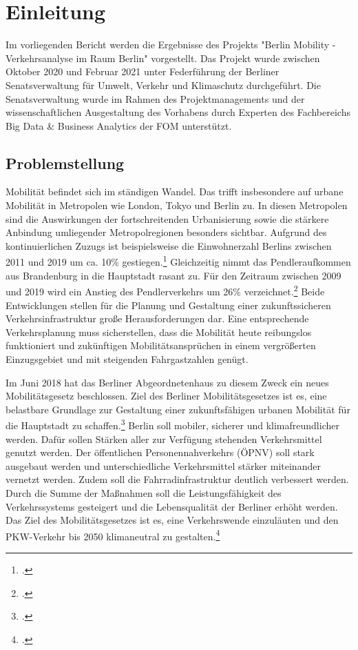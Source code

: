 \section{Einleitung}
Im vorliegenden Bericht werden die Ergebnisse des Projekts "Berlin Mobility - Verkehrsanalyse im Raum Berlin" vorgestellt. Das Projekt wurde zwischen Oktober 2020 und Februar 2021 unter Federführung der Berliner Senatsverwaltung für Umwelt, Verkehr und Klimaschutz durchgeführt. Die Senatsverwaltung wurde im Rahmen des Projektmanagements und der wissenschaftlichen Ausgestaltung des Vorhabens durch Experten des Fachbereichs Big Data \& Business Analytics der \ac{FOM} unterstützt.

\subsection{Problemstellung}\label{problems}
Mobilität befindet sich im ständigen Wandel. Das trifft insbesondere auf urbane Mobilität in Metropolen wie London, Tokyo und Berlin zu. In diesen Metropolen sind die Auswirkungen der fortschreitenden Urbanisierung sowie die stärkere Anbindung umliegender Metropolregionen besonders sichtbar. Aufgrund des kontinuierlichen Zuzugs ist beispielsweise die Einwohnerzahl Berlins zwischen 2011 und 2019 um ca. 10\% gestiegen.\footcite{Statista.2020} Gleichzeitig nimmt das Pendleraufkommen aus Brandenburg in die Hauptstadt rasant zu. Für den Zeitraum zwischen 2009 und 2019 wird ein Anstieg des Pendlerverkehrs um 26\% verzeichnet.\footcite{VBB-Pendlerblatt.2020} %
Beide Entwicklungen stellen für die Planung und Gestaltung einer zukunftssicheren Verkehrsinfrastruktur große Herausforderungen dar. Eine entsprechende Verkehrsplanung muss sicherstellen, dass die Mobilität heute reibungslos funktioniert und zukünftigen Mobilitätsansprüchen in einem vergrößerten Einzugsgebiet und mit steigenden Fahrgastzahlen genügt.

Im Juni 2018 hat das Berliner Abgeordnetenhaus zu diesem Zweck ein neues Mobilitätsgesetz beschlossen. Ziel des Berliner Mobilitätsgesetzes ist es, eine belastbare Grundlage zur Gestaltung einer zukunftsfähigen urbanen Mobilität für die Hauptstadt zu schaffen.\footcite{Mobilitaetsgesetz.2020} Berlin soll mobiler, sicherer und klimafreundlicher werden. Dafür sollen Stärken aller zur Verfügung stehenden Verkehrsmittel genutzt werden. Der öffentlichen Personennahverkehrs (ÖPNV) soll stark ausgebaut werden und unterschiedliche Verkehrsmittel stärker miteinander vernetzt werden. Zudem soll die Fahrradinfrastruktur deutlich verbessert werden. Durch die Summe der Maßnahmen soll die Leistungsfähigkeit des Verkehrssystems gesteigert und die Lebensqualität der Berliner erhöht werden. Das Ziel des Mobilitätsgesetzes ist es, eine Verkehrswende einzuläuten und den PKW-Verkehr bis 2050 klimaneutral zu gestalten.\footcite{Mobilitaetsgesetz.2020}

